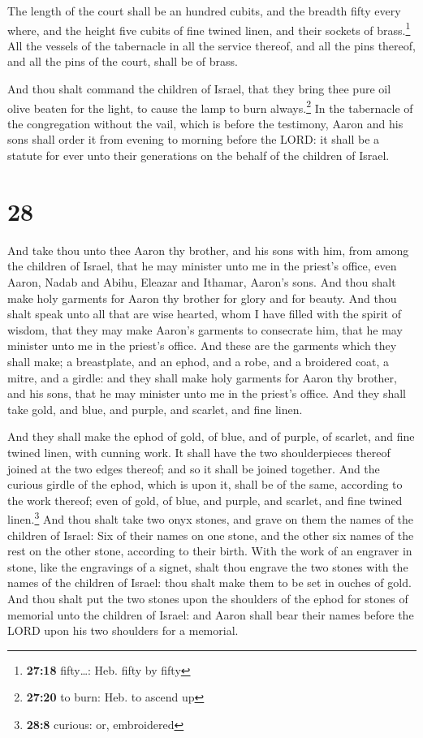 The length of the court shall be an hundred cubits, and
the breadth fifty every where, and the height five cubits of fine twined
linen, and their sockets of brass.\footnote{\textbf{27:18} fifty\ldots:
  Heb. fifty by fifty}  All the vessels of the tabernacle
in all the service thereof, and all the pins thereof, and all the pins
of the court, shall be of brass.

 And thou shalt command the children of Israel, that they
bring thee pure oil olive beaten for the light, to cause the lamp to
burn always.\footnote{\textbf{27:20} to burn: Heb. to ascend up}
 In the tabernacle of the congregation without the vail,
which is before the testimony, Aaron and his sons shall order it from
evening to morning before the LORD: it shall be a statute for ever unto
their generations on the behalf of the children of Israel.

\hypertarget{section-27}{%
\section{28}\label{section-27}}

 And take thou unto thee Aaron thy brother, and his sons
with him, from among the children of Israel, that he may minister unto
me in the priest's office, even Aaron, Nadab and Abihu, Eleazar and
Ithamar, Aaron's sons.  And thou shalt make holy garments
for Aaron thy brother for glory and for beauty.  And thou
shalt speak unto all that are wise hearted, whom I have filled with the
spirit of wisdom, that they may make Aaron's garments to consecrate him,
that he may minister unto me in the priest's office.  And
these are the garments which they shall make; a breastplate, and an
ephod, and a robe, and a broidered coat, a mitre, and a girdle: and they
shall make holy garments for Aaron thy brother, and his sons, that he
may minister unto me in the priest's office.  And they
shall take gold, and blue, and purple, and scarlet, and fine linen.

 And they shall make the ephod of gold, of blue, and of
purple, of scarlet, and fine twined linen, with cunning work.
 It shall have the two shoulderpieces thereof joined at
the two edges thereof; and so it shall be joined together.
 And the curious girdle of the ephod, which is upon it,
shall be of the same, according to the work thereof; even of gold, of
blue, and purple, and scarlet, and fine twined linen.\footnote{\textbf{28:8}
  curious: or, embroidered}  And thou shalt take two onyx
stones, and grave on them the names of the children of Israel:
 Six of their names on one stone, and the other six names
of the rest on the other stone, according to their birth.
 With the work of an engraver in stone, like the
engravings of a signet, shalt thou engrave the two stones with the names
of the children of Israel: thou shalt make them to be set in ouches of
gold.  And thou shalt put the two stones upon the
shoulders of the ephod for stones of memorial unto the children of
Israel: and Aaron shall bear their names before the LORD upon his two
shoulders for a memorial.

